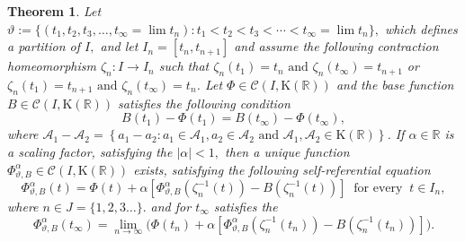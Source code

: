 \documentclass[12pt,oneside,reqno]{amsart}
\newtheorem{theorem}{Theorem}[section]
\theoremstyle{definition}
\theoremstyle{remark}
\begin{document}
\begin{theorem}\label{Thm3.2}
Let   $\vartheta:=\{(t_1,t_2,t_3,\ldots,t_\infty=\lim t_n): t_1 < t_2 <t_3< \cdots <t_\infty=\lim t_n \},$ which  defines a partition of $I,$ and let $I_n=[t_n,t_{n+1}]$ and assume the following contraction homeomorphism $\zeta_n:I \rightarrow I_n $ such that $\zeta_{n}(t_1)=t_{n} \text{ and } \zeta_{n}(t_\infty)=t_{n+1}$ or $\zeta_{n}(t_1)=t_{n+1} \text{ and } \zeta_{n}(t_\infty)=t_{n}$. Let $\Phi\in \mathcal{C}(I,\mathrm{K}(\mathbb{R}))$  and the base function $B \in \mathcal{C}( I, \mathrm{K}( \mathbb{R}) )$ satisfies the following condition
   \[B(t_1)-\Phi(t_1)=B(t_\infty)-\Phi(t_\infty),\]
  where $\mathcal{A}_1-\mathcal{A}_2=\left\{a_1-a_2: a_1\in \mathcal{A}_1, a_2 \in \mathcal{A}_2 \text{ and } \mathcal{A}_1,\mathcal{A}_2\in \mathrm{K}(\mathbb{R}) \right\}$. 
  If $\alpha \in \mathbb{R}$ is a scaling factor, satisfying the $\lvert \alpha \rvert < 1,$ then  a unique function $\Phi^{\alpha}_{\vartheta,B} \in \mathcal{C}( I, \mathrm{K}( \mathbb{R}) )$ exists,  satisfying the following self-referential equation 
   \begin{equation}\label{self12}
      \Phi^{\alpha}_{\vartheta,B}(t)= \Phi(t) + \alpha [\Phi^{\alpha}_{\vartheta,B}(\zeta_n^{-1}(t)) - B(\zeta_n^{-1}(t))] ~\text{ for every }~ t\in I_n,
   \end{equation}
    where $n \in J=\{1,2,3\ldots\}. $ and for $t_\infty$ satisfies the
    \begin{equation}\label{eqn4}
        \Phi^{\alpha}_{\vartheta,B}(t_\infty)=\underset{n \rightarrow \infty}{\lim}\Big(\Phi(t_n) + \alpha [\Phi^{\alpha}_{\vartheta,B}(\zeta_n^{-1}(t_n)) - B(\zeta_n^{-1}(t_n))]\Big).
    \end{equation}
    \
   \end{theorem}
\end{document}
